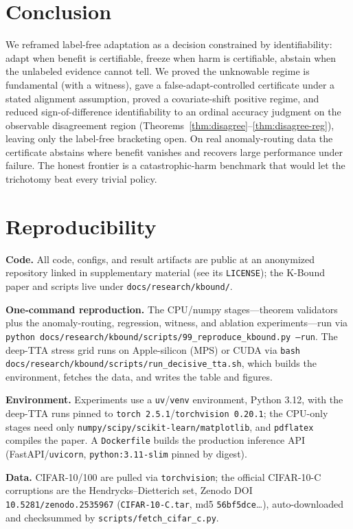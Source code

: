 \documentclass[conference]{IEEEtran}
\theoremstyle{plain}
\theoremstyle{definition}
\begin{document}
\section{Conclusion}
We reframed label-free adaptation as a decision constrained by identifiability: adapt
when benefit is certifiable, freeze when harm is certifiable, abstain when the
unlabeled evidence cannot tell. We proved the unknowable regime is fundamental (with a
witness), gave a false-adapt-controlled certificate under a stated alignment
assumption, proved a covariate-shift positive regime, and reduced sign-of-difference
identifiability to an ordinal accuracy judgment on the observable disagreement region
(Theorems~\ref{thm:disagree}--\ref{thm:disagree-reg}), leaving only the label-free bracketing open. On real
anomaly-routing data the certificate abstains where benefit vanishes and recovers large
performance under failure. The honest frontier is a catastrophic-harm benchmark that
would let the trichotomy beat every trivial policy.

\section{Reproducibility}\label{sec:repro}
\textbf{Code.} All code, configs, and result artifacts are public at
an anonymized repository linked in supplementary material (see its \texttt{LICENSE}); the
K-Bound paper and scripts live under \texttt{docs/research/kbound/}.

\noindent\textbf{One-command reproduction.} The CPU/numpy stages---theorem validators plus the
anomaly-routing, regression, witness, and ablation experiments---run via
\texttt{python docs/research/kbound/scripts/99\_reproduce\_kbound.py --run}. The deep-TTA stress
grid runs on Apple-silicon (MPS) or CUDA via
\texttt{bash docs/research/kbound/scripts/run\_decisive\_tta.sh}, which builds the environment,
fetches the data, and writes the table and figures.

\noindent\textbf{Environment.} Experiments use a \texttt{uv}/\texttt{venv} environment, Python
3.12, with the deep-TTA runs pinned to \texttt{torch 2.5.1}/\texttt{torchvision 0.20.1}; the
CPU-only stages need only \texttt{numpy/scipy/scikit-learn/matplotlib}, and \texttt{pdflatex}
compiles the paper. A \texttt{Dockerfile} builds the production inference API
(FastAPI/\texttt{uvicorn}, \texttt{python:3.11-slim} pinned by digest).

\noindent\textbf{Data.} CIFAR-10/100 are pulled via \texttt{torchvision}; the official CIFAR-10-C
corruptions are the Hendrycks--Dietterich set, Zenodo DOI \texttt{10.5281/zenodo.2535967}
(\texttt{CIFAR-10-C.tar}, md5 \texttt{56bf5dce}\dots), auto-downloaded and checksummed by
\texttt{scripts/fetch\_cifar\_c.py}.
\end{document}
